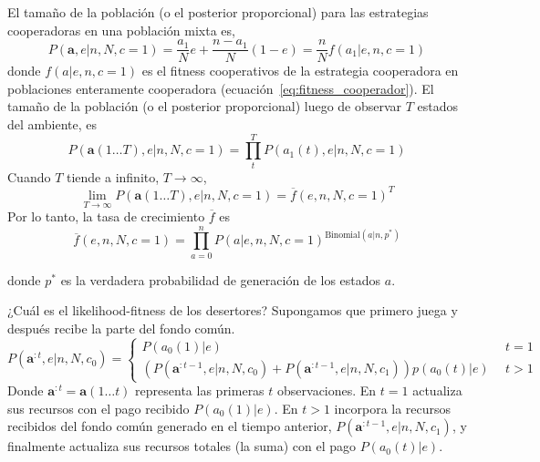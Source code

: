 \documentclass[a4paper,10pt]{article}
\begin{document}
El tamaño de la población (o el posterior proporcional) para las estrategias cooperadoras en una población mixta es, 
%
\begin{equation}
P(\bm{a},e|n,N,c=1) = \frac{a_1}{N} e + \frac{n-a_1}{N}(1-e) = \frac{n}{N} f(a_1|e,n,c=1)
\end{equation}
donde $f(a|e,n,c=1)$ es el fitness cooperativos de la estrategia cooperadora en poblaciones enteramente cooperadora (ecuación~\ref{eq:fitness_cooperador}).
El tamaño de la población (o el posterior proporcional) luego de observar $T$ estados del ambiente, es
%
\begin{equation}
P(\bm{a}(1 \dots T),e|n,N,c=1) = \prod^T_t P(a_1(t),e|n,N,c=1)
\end{equation}
%
Cuando $T$ tiende a infinito, $T \rightarrow \infty$,
\begin{equation}
\lim_{T \rightarrow \infty}P(\bm{a}(1 \dots T),e|n,N,c=1) = \overline{f}(e,n,N,c=1)^T
\end{equation}
Por lo tanto, la tasa de crecimiento $\overline{f}$ es
\begin{equation} \label{eq:coop_temporal_average}
\overline{f}(e,n,N,c=1) = \prod_{a=0}^n P(a|e,n,N,c=1)^{\text{Binomial}(a|n,p^*)}
\end{equation}

%
donde $p^*$ es la verdadera probabilidad de generación de los estados $a$.
% 


¿Cuál es el likelihood-fitness de los desertores?
Supongamos que primero juega y después recibe la parte del fondo común.
\begin{equation}
P(\bm{a}^{:t},e|n,N, c_0) =
\begin{cases}
 P(a_0(1)|e) & \ \  t=1 \\
 (P(\bm{a}^{:t-1},e|n,N,c_0) + P(\bm{a}^{:t-1}, e|n,N,c_1)) p(a_0(t)|e) & \ \  t>1
\end{cases}
\end{equation}
Donde $\bm{a}^{:t} = \bm{a}(1 \dots t)$ representa las primeras $t$ observaciones.
En $t=1$ actualiza sus recursos con el pago recibido $P(a_0(1)|e)$.
En $t>1$ incorpora la recursos recibidos del fondo común generado en el tiempo anterior, $ P(\bm{a}^{:t-1}, e|n,N,c_1)$, y finalmente actualiza sus recursos totales (la suma) con el pago $P(a_0(t)|e)$.
\end{document}

